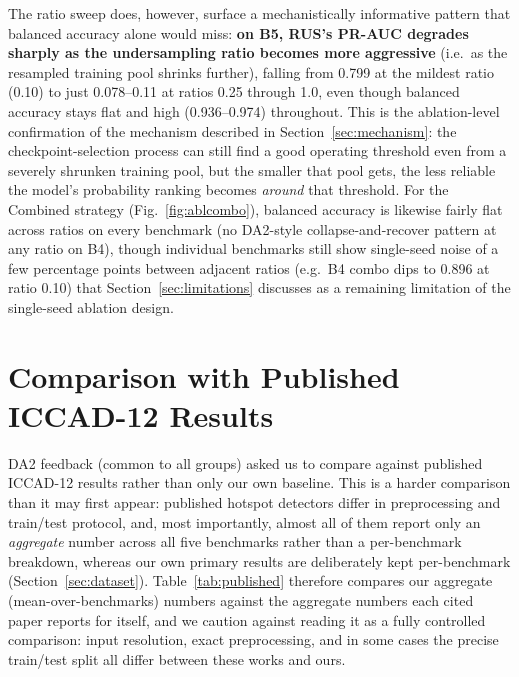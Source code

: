 \documentclass[conference]{IEEEtran}
\begin{document}
The ratio sweep does, however, surface a mechanistically informative
pattern that balanced accuracy alone would miss: \textbf{on B5,
RUS's PR-AUC degrades sharply as the undersampling ratio becomes more
aggressive} (i.e.\ as the resampled training pool shrinks further),
falling from 0.799 at the mildest ratio (0.10) to just 0.078--0.11 at
ratios 0.25 through 1.0, even though balanced accuracy stays flat and
high (0.936--0.974) throughout. This is the ablation-level confirmation
of the mechanism described in Section~\ref{sec:mechanism}: the
checkpoint-selection process can still find a good operating threshold
even from a severely shrunken training pool, but the smaller that pool
gets, the less reliable the model's probability ranking becomes
\emph{around} that threshold. For the Combined strategy
(Fig.~\ref{fig:ablcombo}), balanced accuracy is likewise fairly flat
across ratios on every benchmark (no DA2-style collapse-and-recover
pattern at any ratio on B4), though individual benchmarks still show
single-seed noise of a few percentage points between adjacent ratios
(e.g.\ B4 combo dips to 0.896 at ratio 0.10) that
Section~\ref{sec:limitations} discusses as a remaining limitation of
the single-seed ablation design.

\section{Comparison with Published ICCAD-12 Results}
\label{sec:published}
DA2 feedback (common to all groups) asked us to compare against
published ICCAD-12 results rather than only our own baseline. This is
a harder comparison than it may first appear: published hotspot
detectors differ in preprocessing and train/test protocol, and, most
importantly, almost all of them report only an \emph{aggregate}
number across all five benchmarks rather than a per-benchmark
breakdown, whereas our own primary results are deliberately kept
per-benchmark (Section~\ref{sec:dataset}). Table~\ref{tab:published}
therefore compares our aggregate (mean-over-benchmarks) numbers
against the aggregate numbers each cited paper reports for itself, and
we caution against reading it as a fully controlled comparison: input
resolution, exact preprocessing, and in some cases the precise
train/test split all differ between these works and ours.
\end{document}
